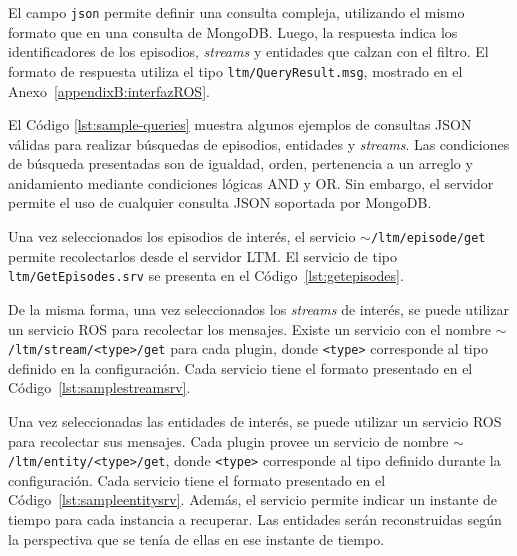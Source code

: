 El campo \texttt{json} permite definir una consulta compleja, utilizando el mismo formato que en una consulta de MongoDB. Luego, la respuesta indica los identificadores de los episodios, \textit{streams} y entidades que calzan con el filtro. El formato de respuesta utiliza el tipo \texttt{ltm/QueryResult.msg}, mostrado en el Anexo~\ref{appendixB:interfazROS}. 

El Código \ref{lst:sample-queries} muestra algunos ejemplos de consultas JSON válidas para realizar búsquedas de episodios, entidades y \textit{streams}. Las condiciones de búsqueda presentadas son de igualdad, orden, pertenencia a un arreglo y anidamiento mediante condiciones lógicas AND y OR. Sin embargo, el servidor permite el uso de cualquier consulta JSON soportada por MongoDB.
\lstset{style=/Style/JSON}



Una vez seleccionados los episodios de interés, el servicio \texttt{$\sim$/ltm/episode/get} permite recolectarlos desde el servidor LTM. El servicio de tipo \texttt{ltm/GetEpisodes.srv} se presenta en el Código~\ref{lst:getepisodes}.
\lstset{style=/Style/ROS/MSG}


De la misma forma, una vez seleccionados los \textit{streams} de interés, se puede utilizar un servicio ROS para recolectar los mensajes. Existe un servicio con el nombre \texttt{$\sim$/ltm/stream/\textless type\textgreater/get} para cada plugin, donde \texttt{\textless type\textgreater} corresponde al tipo definido en la configuración. Cada servicio tiene el formato presentado en el Código~\ref{lst:samplestreamsrv}.

Una vez seleccionadas las entidades de interés, se puede utilizar un servicio ROS para recolectar sus mensajes. Cada plugin provee un servicio de nombre \texttt{$\sim$/ltm/entity/\textless type\textgreater/get}, donde \texttt{\textless type\textgreater}  corresponde al tipo definido durante la configuración. Cada servicio tiene el formato presentado en el Código~\ref{lst:sampleentitysrv}. Además, el servicio permite indicar un instante de tiempo para cada instancia a recuperar. Las entidades serán reconstruidas según la perspectiva que se tenía de ellas en ese instante de tiempo.


